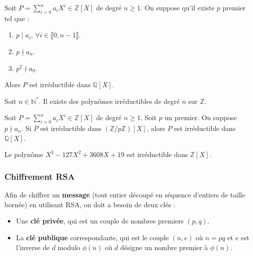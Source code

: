 	\begin{theorem}
		Soit $P = \sum_{i=0}^n a_i X^i \in \mathbb{Z}[X]$ de degré $n \geq 1$. On suppose qu'il existe $p$ premier tel que :
		\begin{enumerate}[label=(\roman*)]
			\item $p \mid a_i$, $\forall i \in \llbracket 0, n-1 \rrbracket$.
			\item $p \nmid a_n$.
			\item $p^2 \nmid a_0$.
		\end{enumerate}
		Alors $P$ est irréductible dans $\mathbb{Q}[X]$.
	\end{theorem}
	
	
	\begin{application}
		Soit $n \in \mathbb{N}^*$. Il existe des polynômes irréductibles de degré $n$ sur $\mathbb{Z}$.
	\end{application}
	
	
	\begin{theorem}
		Soit $P = \sum_{i=0}^n a_i X^i \in \mathbb{Z}[X]$ de degré $n \geq 1$. Soit $p$ un premier. On suppose $p \nmid a_n$.
		\newpar
		Si $\overline{P}$ est irréductible dans $(\mathbb{Z}/p\mathbb{Z})[X]$, alors $P$ est irréductible dans $\mathbb{Q}[X]$.
	\end{theorem}
	
	\begin{example}
		Le polynôme $X^3-127X^2+3608X+19$ est irréductible dans $\mathbb{Z}[X]$.
	\end{example}
	
	\subsubsection{Chiffrement RSA}
	
	
	\begin{definition}
		Afin de chiffrer un \textbf{message} (tout entier découpé en séquence d'entiers de taille bornée) en utilisant RSA, on doit a besoin de deux clés :
		\begin{itemize}
			\item Une \textbf{clé privée}, qui est un couple de nombres premiers $(p,q)$.
			\item La \textbf{clé publique} correspondante, qui est le couple $(n,e)$ où $n = pq$ et $e$ est l'inverse de $d$ modulo $\phi(n)$ où $d$ désigne un nombre premier à $\phi(n)$.
		\end{itemize}
	\end{definition}
	
